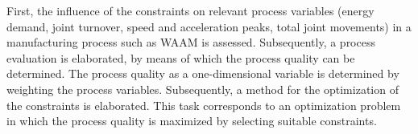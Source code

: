 First, the influence of the constraints on relevant process variables (energy demand, joint turnover, speed and acceleration peaks, total joint movements) in a manufacturing process such as \acrshort{WAAM} is assessed. Subsequently, a process evaluation is elaborated, by means of which the process quality can be determined. %
The process quality as a one-dimensional variable is determined by weighting the process variables. Subsequently, a method for the optimization of the constraints is elaborated. This task corresponds to an optimization problem in which the process quality is maximized by selecting suitable constraints. 
